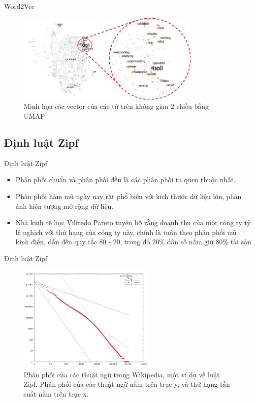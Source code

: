 \documentclass[10pt]{beamer}
\theoremstyle{remark}
\theoremstyle{definition}
\begin{document}
\begin{frame}{Word2Vec}
	\begin{figure}[h!]
        \centering
        \includegraphics[width=0.8\textwidth]{word2vec-visualization.png}
        \caption{Minh họa các vector của các từ trên không gian 2 chiều bằng UMAP \cite{mcinnes2018umap}}
        \label{fig:word2vec-visualization}
    \end{figure}
\end{frame}

\subsection{Định luật Zipf}

\begin{frame}{Định luật Zipf}
	\begin{itemize}
		\item Phân phối chuẩn và phân phối đều là các phân phối ta quen thuộc nhất.
		\item Phân phối hàm mũ ngày nay rất phổ biến với kích thước dữ liệu lớn, phản ánh hiện tượng mở rộng dữ liệu.
		\item Nhà kinh tế học Vilfredo Pareto tuyên bố rằng doanh thu của một công ty tỷ lệ nghịch với thứ hạng của công ty này, chính là tuân theo phân phối mũ kinh điển,
		dẫn đến quy tắc 80 - 20, trong đó 20\% dân số nắm giữ 80\% tài sản
	\end{itemize}
	
\end{frame}

\begin{frame}{Định luật Zipf}
	\begin{figure}[h!]
        \centering
        \includegraphics[width=0.6\textwidth]{2.png}
        \caption{Phân phối của các thuật ngữ trong Wikipedia, một ví dụ về luật Zipf.
        Phân phối của các thuật ngữ nằm trên trục y, và thứ hạng tần suất nằm trên trục x.}
        \label{fig:2}
    \end{figure}

\end{frame}
\end{document}
